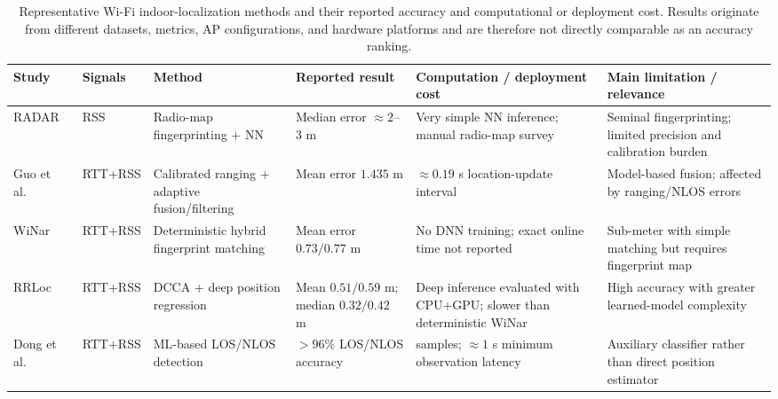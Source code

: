 \begin{table}[!t]
	\centering
	\caption{Representative Wi-Fi indoor-localization methods and their reported accuracy and computational or deployment cost. Results originate from different datasets, metrics, AP configurations, and hardware platforms and are therefore not directly comparable as an accuracy ranking.}
	\label{tab:related_work_comparison}
	\footnotesize
	\setlength{\tabcolsep}{2.5pt}
	\renewcommand{\arraystretch}{1.15}
	\begin{tabular}{>{\raggedright\arraybackslash}p{2.9cm}>{\raggedright\arraybackslash}p{1.9cm}>{\raggedright\arraybackslash}p{3.1cm}>{\raggedright\arraybackslash}p{3.1cm}>{\raggedright\arraybackslash}p{3.4cm}>{\raggedright\arraybackslash}p{3.1cm}}
		\toprule
		\textbf{Study} &
		\textbf{Signals} &
		\textbf{Method} &
		\textbf{Reported result} &
		\textbf{Computation / deployment cost} &
		\textbf{Main limitation / relevance} \\
		\midrule
		
		RADAR~\cite{bahl2000radar} &
		RSS &
		Radio-map fingerprinting + NN &
		Median error $\approx2$--$3$ m &
		Very simple NN inference; manual radio-map survey &
		Seminal fingerprinting; limited precision and calibration burden \\
		
		Guo et al.~\cite{guo2019hybrid} &
		RTT+RSS &
		Calibrated ranging + adaptive fusion/filtering &
		Mean error $1.435$ m &
		$\approx0.19$ s location-update interval &
		Model-based fusion; affected by ranging/NLOS errors \\
		
		WiNar~\cite{hashem2021winar} &
		RTT+RSS &
		Deterministic hybrid fingerprint matching &
		Mean error $0.73/0.77$ m &
		No DNN training; exact online time not reported &
		Sub-meter with simple matching but requires fingerprint map \\
		
		RRLoc~\cite{rizk2022rrloc} &
		RTT+RSS &
		DCCA + deep position regression &
		Mean $0.51/0.59$ m; median $0.32/0.42$ m &
		Deep inference evaluated with CPU+GPU; slower than deterministic WiNar &
		High accuracy with greater learned-model complexity \\
		
		Dong et al.~\cite{dong2022nlos} &
		RTT+RSS &
		ML-based LOS/NLOS detection &
		$>96\%$ LOS/NLOS accuracy &
		10 samples; $\approx1$ s minimum observation latency &
		Auxiliary classifier rather than direct position estimator \\
		

\end{tabular}
\end{table}
